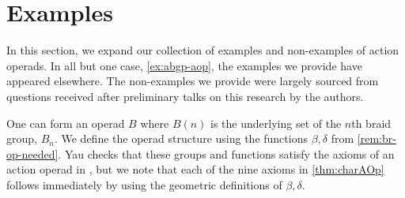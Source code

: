\section{Examples}\label{sec:aop-examples}

In this section, we expand our collection of examples  and non-examples of action operads. 
In all but one case, \cref{ex:abgp-aop}, the examples we provide have appeared elsewhere.
The non-examples we provide were largely sourced from questions received after preliminary talks on this research by the authors. 

\begin{example}\label{example:aop-braid}
One can form an operad $B$ where $B(n)$ is the underlying set of the $n$th braid group, $B_{n}$.
We define the operad structure using the functions $\beta, \delta$ from \cref{rem:br-op-needed}.
Yau checks that these groups and functions satisfy the axioms of an action operad in \cite[Prop 5.2.5]{yau_infinity_2021}, but we note that each of the nine axioms in \cref{thm:charAOp} follows immediately by using the geometric definitions of $\beta, \delta$.
%
%
%
%
%
\end{example}

